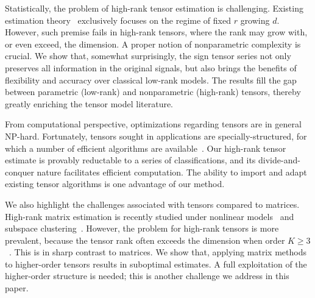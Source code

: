 \documentclass[11pt]{article}
\theoremstyle{plain}
\theoremstyle{definition}
\begin{document}
Statistically, the problem of high-rank tensor estimation is challenging. Existing estimation theory~\citep{anandkumar2014tensor,montanari2018spectral,cai2019nonconvex} exclusively focuses on the regime of fixed $r$ growing $d$. However, such premise fails in high-rank tensors, where the rank may grow with, or even exceed, the dimension. A proper notion of nonparametric complexity is crucial. We show that, somewhat surprisingly, the sign tensor series not only preserves all information in the original signals, but also brings the benefits of flexibility and accuracy over classical low-rank models. The results fill the gap between parametric (low-rank) and nonparametric (high-rank) tensors, thereby greatly enriching the tensor model literature. 

From computational perspective, optimizations regarding tensors are in general NP-hard. Fortunately, tensors sought in applications are specially-structured, for which a number of efficient algorithms are available~\citep{ghadermarzy2018learning,wang2018learning, han2020optimal}. Our high-rank tensor estimate is provably reductable to a series of classifications, and its divide-and-conquer nature facilitates efficient computation. The ability to import and adapt existing tensor algorithms is one advantage of our method. 

We also highlight the challenges associated with tensors compared to matrices. High-rank matrix estimation is recently studied under nonlinear models~\citep{ganti2015matrix} and subspace clustering~\citep{pmlr-v70-ongie17a,fan2019online}. However, the problem for high-rank tensors is more prevalent, because the tensor rank often exceeds the dimension when order $K\geq 3$~\citep{anandkumar2017analyzing}. This is in sharp contrast to matrices. We show that, applying matrix methods to higher-order tensors results in suboptimal estimates. A full exploitation of the higher-order structure is needed; this is another challenge we address in this paper.
\end{document}
